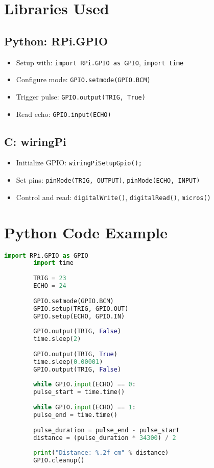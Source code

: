 \documentclass{article}
\begin{document}
	\section{Libraries Used}
	\subsection*{Python: RPi.GPIO}
	\begin{itemize}
		\item Setup with: \texttt{import RPi.GPIO as GPIO}, \texttt{import time}
		\item Configure mode: \texttt{GPIO.setmode(GPIO.BCM)}
		\item Trigger pulse: \texttt{GPIO.output(TRIG, True)}
		\item Read echo: \texttt{GPIO.input(ECHO)}
	\end{itemize}
	
	\subsection*{C: wiringPi}
	\begin{itemize}
		\item Initialize GPIO: \texttt{wiringPiSetupGpio();}
		\item Set pins: \texttt{pinMode(TRIG, OUTPUT)}, \texttt{pinMode(ECHO, INPUT)}
		\item Control and read: \texttt{digitalWrite()}, \texttt{digitalRead()}, \texttt{micros()}
	\end{itemize}
	
	\section{Python Code Example}
	\begin{lstlisting}[language=Python]
		import RPi.GPIO as GPIO
		import time
		
		TRIG = 23
		ECHO = 24
		
		GPIO.setmode(GPIO.BCM)
		GPIO.setup(TRIG, GPIO.OUT)
		GPIO.setup(ECHO, GPIO.IN)
		
		GPIO.output(TRIG, False)
		time.sleep(2)
		
		GPIO.output(TRIG, True)
		time.sleep(0.00001)
		GPIO.output(TRIG, False)
		
		while GPIO.input(ECHO) == 0:
		pulse_start = time.time()
		
		while GPIO.input(ECHO) == 1:
		pulse_end = time.time()
		
		pulse_duration = pulse_end - pulse_start
		distance = (pulse_duration * 34300) / 2
		
		print("Distance: %.2f cm" % distance)
		GPIO.cleanup()
	\end{lstlisting}
	
\end{document}
